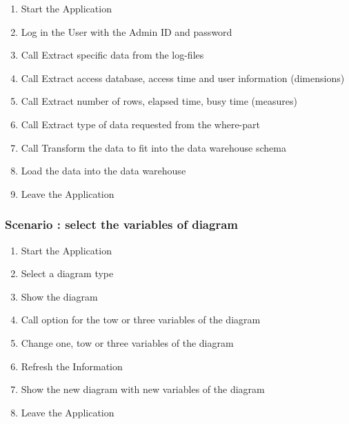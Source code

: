 \begin{enumerate}

\item Start the Application

\item Log in the User with the Admin ID and password

\item Call Extract specific data from the log-files

\item Call Extract access database, access time and user information (dimensions)

\item Call Extract number of rows, elapsed time, busy time (measures)

\item Call Extract type of data requested from the where-part

\item Call Transform the data to fit into the data warehouse schema

\item Load the data into the data warehouse

\item Leave the Application

\end{enumerate}

\subsubsection {Scenario : select the variables of diagram} 

\begin{enumerate}

\item Start the Application

\item Select a diagram type

\item Show the diagram

\item Call option for the tow or three variables of the diagram

\item Change one, tow or three variables of the diagram

\item Refresh the Information

\item Show the new diagram with new variables of the diagram

\item Leave the Application

\end{enumerate}

